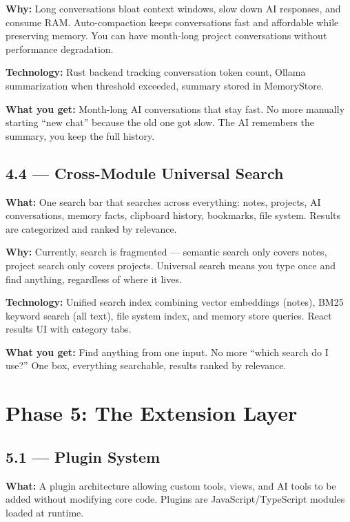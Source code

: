 \documentclass[11pt,a4paper]{article}
\begin{document}
\textbf{Why:} Long conversations bloat context windows, slow down AI responses, and consume RAM. Auto-compaction keeps conversations fast and affordable while preserving memory. You can have month-long project conversations without performance degradation.

\textbf{Technology:} Rust backend tracking conversation token count, Ollama summarization when threshold exceeded, summary stored in MemoryStore.

\textbf{What you get:} Month-long AI conversations that stay fast. No more manually starting ``new chat'' because the old one got slow. The AI remembers the summary, you keep the full history.

\subsection{4.4 --- Cross-Module Universal Search}

\textbf{What:} One search bar that searches across everything: notes, projects, AI conversations, memory facts, clipboard history, bookmarks, file system. Results are categorized and ranked by relevance.

\textbf{Why:} Currently, search is fragmented --- semantic search only covers notes, project search only covers projects. Universal search means you type once and find anything, regardless of where it lives.

\textbf{Technology:} Unified search index combining vector embeddings (notes), BM25 keyword search (all text), file system index, and memory store queries. React results UI with category tabs.

\textbf{What you get:} Find anything from one input. No more ``which search do I use?'' One box, everything searchable, results ranked by relevance.

\section{Phase 5: The Extension Layer}

\subsection{5.1 --- Plugin System}

\textbf{What:} A plugin architecture allowing custom tools, views, and AI tools to be added without modifying core code. Plugins are JavaScript/TypeScript modules loaded at runtime.
\end{document}
